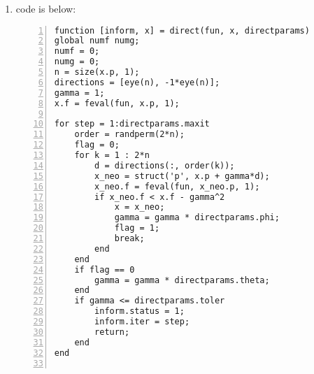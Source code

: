\documentclass[12pt]{article}
\def \1{\mathds{1}}
\begin{document}
\begin{enumerate}
\begin{lstlisting}[language={[ANSI]C}, numbers=left, numberstyle=\tiny, frame=shadowbox, basicstyle=\ttfamily\small, showspaces=false, breaklines=true, showstringspaces=false, showtabs=false]
%% initial
n = size(x, 2);
N = (n+1)*(n+2) / 2;
big = zeros(N, N);

%% transform
for row = 1 : N
    big(row, 1) = 1;
    big(row, 2:1+n) = x(row,:);
    col = 1+n;
    for i = 1:n
        for j = i:n
            col = col + 1;
            if i == j
                big(row, col) = 0.5*x(row,i)^2;
            else
                big(row, col) = x(row,i) * x(row, j);
            end
        end
    end
end

%% calculate
solution = pinv(big) * y;

%% transform back
c = solution(1);
g = zeros(n,1);
g(1:n) = solution(2:1+n);
G = zeros(n,n);
col = n+1;
for i = 1:n
    for j = i:n
        col = col + 1;
        G(i, j) = solution(col);
        G(j, i) = solution(col);
    end
end
\end{lstlisting}

\bigskip

answer is below:

$c=1$

$g=\begin{bmatrix}-0.9878\\-2.9878\end{bmatrix}$

$G=\begin{bmatrix}3.9923&1.0000\\1.0000&1.9923\end{bmatrix}$



\bigskip

\item

code is below:



\begin{lstlisting}[language={[ANSI]C}, numbers=left, numberstyle=\tiny, frame=shadowbox, basicstyle=\ttfamily\small, showspaces=false, breaklines=true, showstringspaces=false, showtabs=false]
function [inform, x] = direct(fun, x, directparams)
global numf numg;
numf = 0;
numg = 0;
n = size(x.p, 1);
directions = [eye(n), -1*eye(n)];
gamma = 1;
x.f = feval(fun, x.p, 1);

for step = 1:directparams.maxit
    order = randperm(2*n);
    flag = 0;
    for k = 1 : 2*n
        d = directions(:, order(k));
        x_neo = struct('p', x.p + gamma*d);
        x_neo.f = feval(fun, x_neo.p, 1);
        if x_neo.f < x.f - gamma^2
            x = x_neo;
            gamma = gamma * directparams.phi;
            flag = 1;
            break;
        end
    end
    if flag == 0
        gamma = gamma * directparams.theta;
    end
    if gamma <= directparams.toler
        inform.status = 1;
        inform.iter = step;
        return;
    end
end


\end{lstlisting}
\end{enumerate}
\end{document}
